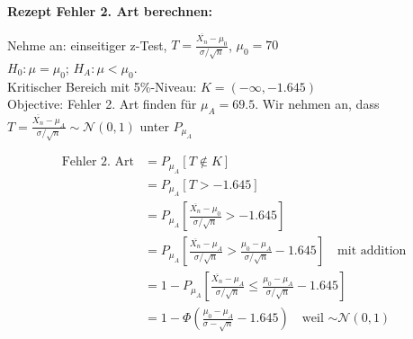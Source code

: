 \begin{mdframed}
	
	\textbf{Rezept Fehler 2. Art berechnen:}
	
	Nehme an: einseitiger z-Test, $T=\frac{\overline{X_n}-\mu_0}{\sigma / \sqrt{n}}$, $\mu_0 = 70$\\
	
	$H_0: \mu = \mu_0$; $H_A: \mu < \mu_0$.\\
	
	Kritischer Bereich mit 5\%-Niveau: $K = (-\infty, -1.645)$\\
	
	Objective: Fehler 2. Art finden für $\mu_A = 69.5$. Wir nehmen an, dass $T=\frac{\overline{X_n}-\mu_A}{\sigma / \sqrt{n}} \sim \mathcal{N}(0, 1)$ unter $P_{\mu_A}$
	
	\begin{align*}
		\text{Fehler 2. Art} &= P_{\mu_A}[T \notin K]\\
		&= P_{\mu_A}[T > - 1.645]\\
		&= P_{\mu_A}\left[\frac{\overline{X_n}-\mu_0}{\sigma / \sqrt{n}} > - 1.645\right]\\
		&= P_{\mu_A}\left[\frac{\overline{X_n}-\mu_A}{\sigma / \sqrt{n}} > \frac{\mu_0 - \mu_A}{\sigma / \sqrt{n}} - 1.645\right]\quad \text{mit addition}\\
		&= 1 - P_{\mu_A}\left[\frac{\overline{X_n}-\mu_A}{\sigma / \sqrt{n}} \leq \frac{\mu_0 - \mu_A}{\sigma / \sqrt{n}} - 1.645\right]\\
		&= 1 - \Phi\left(\frac{\mu_0 - \mu_A}{\sigma - \sqrt{n}} - 1.645\right) \quad \text{weil $\sim \mathcal{N}(0, 1)$}
	\end{align*}
	
\end{mdframed}

